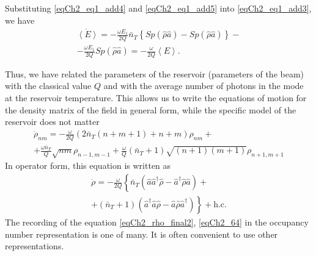 Substituting \eqref{eqCh2_eq1_add4} and \eqref{eqCh2_eq1_add5} into \eqref{eqCh2_eq1_add3}, we have
\begin{eqnarray}
\dot{\left<E\right>} =
- \frac{\omega E_1}{2Q}\bar{n}_T
\left\{Sp\left(\hat{\rho}\hat{a}\right) -
Sp\left(\hat{\rho}\hat{a}\right)\right\} -
\nonumber \\
- \frac{\omega E_1}{2Q}Sp\left(\hat{\rho}\hat{a}\right) = 
- \frac{\omega}{2Q}\left<E\right>.
\label{eqCh2_61}
\end{eqnarray}

Thus, we have related the parameters of the reservoir (parameters of the beam) with the classical value $Q$ and with the average number of photons in the mode at the reservoir temperature. This allows us to write the equations of motion for the density matrix of the field in general form, while the specific model of the reservoir does not matter
\begin{eqnarray}
\dot{\rho}_{nm} = - \frac{\omega}{2 Q}
\left(2 \bar{n}_T\left( n + m + 1\right) + n + m \right)\rho_{nm} +
\nonumber \\
+ \frac{\omega \bar{n}_T}{Q}\sqrt{nm}\rho_{n - 1, m - 1} +
\frac{\omega}{Q}\left(\bar{n}_T + 1\right)
\sqrt{\left(n + 1\right)\left(m + 1\right)}
\rho_{n + 1, m + 1}
\label{eqCh2_63}
\end{eqnarray}
In operator form, this equation is written as
\begin{eqnarray}
\dot{\rho} = - \frac{\omega}{2 Q}
\left\{
\bar{n}_T\left(\hat{a}\hat{a}^{\dag}\hat{\rho} - 
\hat{a}^{\dag}\hat{\rho}\hat{a}\right)
\right. +
\nonumber \\
+
\left .
\left(\bar{n}_T + 1\right)\left(\hat{a}^{\dag}\hat{a}\hat{\rho} - 
\hat{a}\hat{\rho}\hat{a}^{\dag}\right)
\right\} + \text{h.c.}
\label{eqCh2_64}
\end{eqnarray}
The recording of the equation \eqref{eqCh2_rho_final2}, \ref{eqCh2_64} in the occupancy number representation is one of many. It is often convenient to use other representations.  